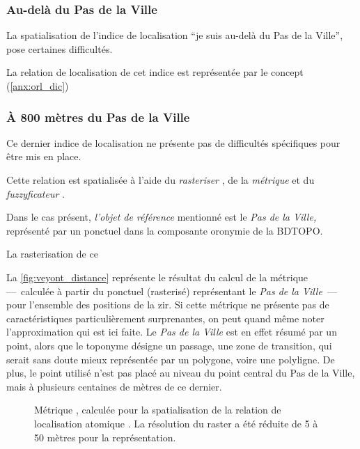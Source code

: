 \subsubsection{Au-delà du Pas de la Ville}

La spatialisation de l'indice de localisation \enquote{je suis au-delà
  du Pas de la Ville}, pose certaines difficultés.

La relation de localisation de cet indice est représentée par le
concept 
(\autoref{anx:orl_dic})

\subsubsection{À 800 mètres du Pas de la Ville}

Ce dernier indice de localisation ne présente pas de difficultés
spécifiques pour être mis en place.


Cette relation est spatialisée à l'aide du \emph{rasteriser}
, de la \emph{métrique}
 et du \emph{fuzzyficateur}
.

Dans le cas présent, \emph{l'objet de référence} mentionné est le
\emph{Pas de la Ville,} représenté par un ponctuel dans la composante
oronymie de la BDTOPO.


La rasterisation de ce



La \autoref{fig:veyont_distance} représente le résultat du calcul de
la métrique  ---~calculée à partir du ponctuel
(rasterisé) représentant le \emph{Pas de la Ville}~--- pour l'ensemble
des positions de la \ac{zir}. Si cette métrique ne présente pas de
caractéristiques particulièrement surprenantes, on peut quand même
noter l'approximation qui est ici faite. Le \emph{Pas de la Ville} est
en effet résumé par un point, alors que le toponyme désigne un
passage, une zone de transition, qui serait sans doute mieux
représentée par un polygone, voire une polyligne. De plus, le point
utilisé n'est pas placé au niveau du point central du Pas de la Ville,
mais à plusieurs centaines de mètres de ce dernier.


\begin{figure}
  \centering
  
  \caption{Métrique \protect{}, calculée pour la
    spatialisation de la relation de localisation atomique
    \protect{}. La résolution
    du raster a été réduite de 5 à 50 mètres pour la représentation.}
  \label{fig:veyont_distance}
\end{figure}

